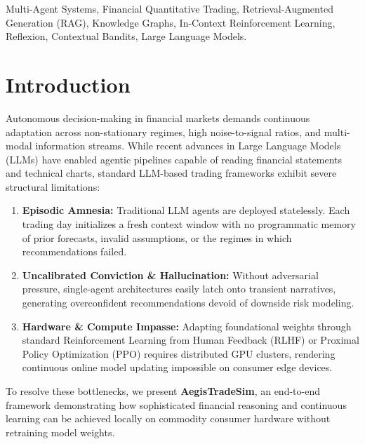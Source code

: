 \documentclass[conference]{IEEEtran}
\begin{document}
\begin{IEEEkeywords}
Multi-Agent Systems, Financial Quantitative Trading, Retrieval-Augmented Generation (RAG), Knowledge Graphs, In-Context Reinforcement Learning, Reflexion, Contextual Bandits, Large Language Models.
\end{IEEEkeywords}

\section{Introduction}
Autonomous decision-making in financial markets demands continuous adaptation across non-stationary regimes, high noise-to-signal ratios, and multi-modal information streams. While recent advances in Large Language Models (LLMs) have enabled agentic pipelines capable of reading financial statements and technical charts, standard LLM-based trading frameworks exhibit severe structural limitations:
\begin{enumerate}
    \item \textbf{Episodic Amnesia:} Traditional LLM agents are deployed statelessly. Each trading day initializes a fresh context window with no programmatic memory of prior forecasts, invalid assumptions, or the regimes in which recommendations failed.
    \item \textbf{Uncalibrated Conviction \& Hallucination:} Without adversarial pressure, single-agent architectures easily latch onto transient narratives, generating overconfident recommendations devoid of downside risk modeling.
    \item \textbf{Hardware \& Compute Impasse:} Adapting foundational weights through standard Reinforcement Learning from Human Feedback (RLHF) or Proximal Policy Optimization (PPO) requires distributed GPU clusters, rendering continuous online model updating impossible on consumer edge devices.
\end{enumerate}

To resolve these bottlenecks, we present \textbf{AegisTradeSim}, an end-to-end framework demonstrating how sophisticated financial reasoning and continuous learning can be achieved locally on commodity consumer hardware without retraining model weights.
\end{document}
